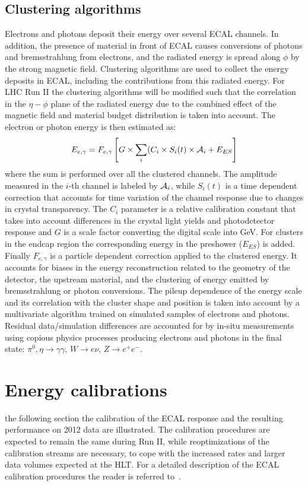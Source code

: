 \documentclass[journal]{IEEEtran}
\begin{document}
\subsection{Clustering algorithms}
\label{sec:clustering}
Electrons and photons deposit their energy over several ECAL channels. In addition, the presence of material in front of ECAL causes conversions of photons and bremsstrahlung from electrons, and the radiated energy is spread along $\phi$ by the strong magnetic field. Clustering algorithms are used to collect the energy deposits in ECAL, including the contributions from this radiated energy. For LHC Run II the clustering algorithms will be modified such that the correlation in the $\eta-\phi$ plane of the radiated energy due to the combined effect of the magnetic field and material budget distribution is taken into account. The electron or photon energy is then estimated as:
\begin{equation}
\label{eqn:energy}
E_{e,\gamma} = F_{e,\gamma}\left[G \times \sum_i(C_i \times S_i(t) \times {\cal A}_i + E_{ES}\right]
\end{equation}
where the sum is performed over all the clustered channels. The amplitude measured in the $i$-th channel is labeled by ${\cal A}_i$, while $S_i(t)$ is a time dependent correction that accounts for time variation of the channel response due to changes in crystal transparency. The $C_i$ parameter is a relative calibration constant that takes into account differences in the crystal light yields and photodetector response and $G$ is a scale factor converting the digital scale into GeV. For clusters in the endcap region the corresponding energy in the preshower ($E_{ES}$) is added. Finally $F_{e,\gamma}$ is a particle dependent correction applied to the clustered energy. It accounts for biases in the energy reconstruction related to the geometry of the detector, the upstream material, and the clustering of energy emitted by bremsstrahlung or photon conversions. The pileup dependence of the energy scale and its correlation with the cluster shape and position is taken into account by a multivariate algorithm trained on simulated samples of electrons and photons.  Residual data/simulation differences are accounted for by in-situ measurements using copious physics processes producing electrons and photons in the final state: $\pi^0,\eta\to\gamma\gamma$, $W\to e\nu$, $Z\to e^+e^-$.



\section{Energy calibrations}
\label{sec:energycalibration}
 the following section the calibration of the ECAL response and the resulting performance on 2012 data are illustrated. The calibration procedures are expected to remain the same during Run II, while reoptimizations of the calibration streams are necessary, to cope with the increased rates and larger data volumes expected at the HLT. For a detailed description of the ECAL calibration procedures the reader is referred to~\cite{Chatrchyan:2013dga}.
\end{document}
